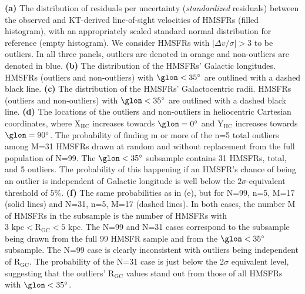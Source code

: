 \label{fig:outliers}
\textbf{(a)} The distribution of residuals per uncertainty (\textit{standardized} residuals) between the observed and KT-derived line-of-sight velocities of HMSFRs (filled histogram), with an appropriately scaled standard normal distribution for reference (empty histogram). We consider HMSFRs with $\vert \Delta v / \sigma \vert > 3$ to be outliers. In all three panels, outliers are denoted in orange and non-outliers are denoted in blue. 
\textbf{(b)} The distribution of the HMSFRs' Galactic longitudes. HMSFRs (outliers and non-outliers) with $\glon < 35^\circ$ are outlined with a dashed black line.
\textbf{(c)} The distribution of the HMSFRs' Galactocentric radii. HMSFRs (outliers and non-outliers) with $\glon < 35^\circ$ are outlined with a dashed black line.
\textbf{(d)} The locations of the outliers and non-outliers in heliocentric Cartesian coordinates, where $\mathrm{X_{HC}}$ increases towards $\glon=0^\circ$ and $\mathrm{Y_{HC}}$ increases towards $\glon=90^\circ$. 
 The probability of finding m or more of the n=5 total outliers among M=31 HMSFRs drawn at random and without replacement from the full population of N=99. The $\glon < 35^\circ$ subsample contains 31 HMSFRs, total, and 5 outliers. The probability of this happening if an HMSFR's chance of being an outlier is independent of Galactic longitude is well below the $2\sigma$-equivalent threshold of $5\%$.
\textbf{(f)} The same probabilities as in (e), but for N=99, n=5, M=17 (solid lines) and N=31, n=5, M=17 (dashed lines). In both cases, the number M of HMSFRs in the subsample is the number of HMSFRs with $3 \text{ kpc} < \mathrm{R_{GC}} < 5\text{ kpc}$. The N=99 and N=31 cases correspond to the subsample being drawn from the full 99 HMSFR sample and from the $\glon < 35^\circ$ subsample. The N=99 case is clearly inconsistent with outliers being independent of $\mathrm{R_{GC}}$. The probability of the N=31 case is just below the 2$\sigma$ equivalent level, suggesting that the outliers' $\mathrm{R_{GC}}$ values stand out from those of all HMSFRs with $\glon < 35^\circ$.

